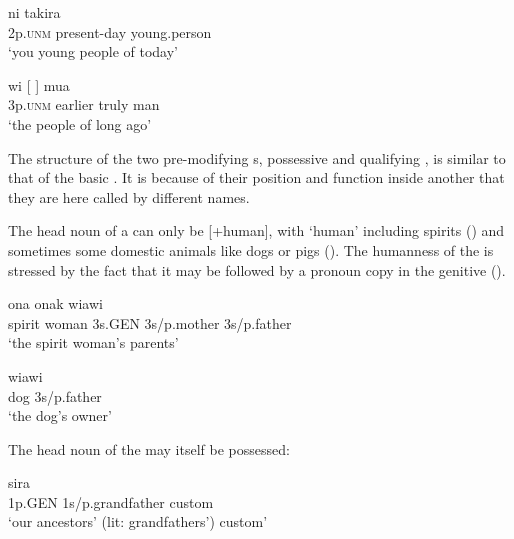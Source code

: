 \ea%
\label{ex:x401}
\gll ni    takira \\
  2p.\textsc{unm}  present-day  young.person    \\
\glt`you young people of today'
\z





\ea%
\label{ex:x1883}
\gll wi  [ ]  mua \\
  3p.\textsc{unm}  earlier  truly  man    \\
\glt`the people of long ago'
\z





The structure of the two pre-modifying s, possessive  and qualifying , is similar to that of the basic . It is because of their position and function inside another  that they are here called by different names.

The head noun of a  can only be [+human], with `human' including spirits () and sometimes some domestic animals like dogs or pigs (). The humanness of the  is stressed by the fact that it may be followed by a pronoun copy in the genitive ().

\ea%
\label{ex:x402}
\gll {}   ona  onak  wiawi \\
    spirit  woman  3s.GEN  3s/p.mother  3s/p.father  \\
\glt`the spirit woman's parents'

\z




\ea%
\label{ex:x403}
\gll {}  wiawi \\
  dog  3s/p.father    \\
\glt`the dog's owner'
\z





The head noun of the  may itself be possessed:

\ea%
\label{ex:x404}
\gll {}   sira \\
 1p.GEN  1s/p.grandfather  custom     \\
\glt`our ancestors' (lit: grandfathers') custom'
\z




